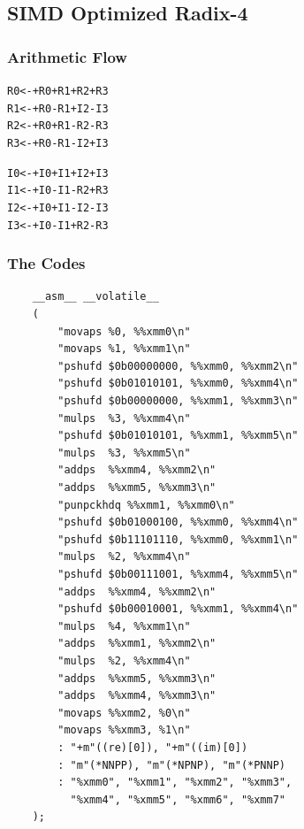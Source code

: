 \documentclass[a4paper]{report}
\begin{document}
\subsection{SIMD Optimized Radix-4} \indent

\subsubsection{Arithmetic Flow} \indent

\begin{alltt}
\centering
R0 <- +R0 +R1 +R2 +R3
R1 <- +R0 -R1 +I2 -I3
R2 <- +R0 +R1 -R2 -R3
R3 <- +R0 -R1 -I2 +I3

I0 <- +I0 +I1 +I2 +I3
I1 <- +I0 -I1 -R2 +R3
I2 <- +I0 +I1 -I2 -I3
I3 <- +I0 -I1 +R2 -R3
\end{alltt}

\subsubsection{The Codes} \indent

    \lstset{language = c, tabsize = 4}
    \begin{lstlisting}
    __asm__ __volatile__
    (
        "movaps %0, %%xmm0\n"                  
        "movaps %1, %%xmm1\n"                  
        "pshufd $0b00000000, %%xmm0, %%xmm2\n" 
        "pshufd $0b01010101, %%xmm0, %%xmm4\n" 
        "pshufd $0b00000000, %%xmm1, %%xmm3\n" 
        "mulps  %3, %%xmm4\n"                  
        "pshufd $0b01010101, %%xmm1, %%xmm5\n" 
        "mulps  %3, %%xmm5\n"                  
        "addps  %%xmm4, %%xmm2\n"              
        "addps  %%xmm5, %%xmm3\n"              
        "punpckhdq %%xmm1, %%xmm0\n"           
        "pshufd $0b01000100, %%xmm0, %%xmm4\n" 
        "pshufd $0b11101110, %%xmm0, %%xmm1\n" 
        "mulps  %2, %%xmm4\n"                  
        "pshufd $0b00111001, %%xmm4, %%xmm5\n" 
        "addps  %%xmm4, %%xmm2\n"              
        "pshufd $0b00010001, %%xmm1, %%xmm4\n" 
        "mulps  %4, %%xmm1\n"                  
        "addps  %%xmm1, %%xmm2\n"              
        "mulps  %2, %%xmm4\n"                  
        "addps  %%xmm5, %%xmm3\n"              
        "addps  %%xmm4, %%xmm3\n"              
        "movaps %%xmm2, %0\n"                  
        "movaps %%xmm3, %1\n"                  
        : "+m"((re)[0]), "+m"((im)[0])         
        : "m"(*NNPP), "m"(*NPNP), "m"(*PNNP)   
        : "%xmm0", "%xmm1", "%xmm2", "%xmm3",  
          "%xmm4", "%xmm5", "%xmm6", "%xmm7"   
    );
    \end{lstlisting}
\end{document}
